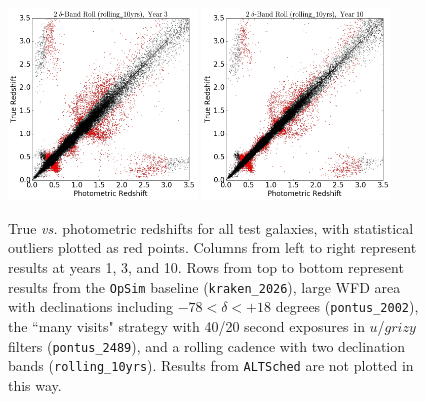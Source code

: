 \begin{figure}
\begin{center}
\includegraphics[width=5cm,trim={0cm 0cm 0cm 0cm},clip]{figures/tzpz_rolling10yrs_3.png}
\includegraphics[width=5cm,trim={0cm 0cm 0cm 0cm},clip]{figures/tzpz_rolling10yrs_10.png}
\caption{True {\it vs.} photometric redshifts for all test galaxies, with statistical outliers plotted as red points. Columns from left to right represent results at years 1, 3, and 10. Rows from top to bottom represent results from the {\tt OpSim} baseline ({\tt kraken\_2026}), large WFD area with declinations including  $-78<\delta<+18$ degrees ({\tt pontus\_2002}), the ``many visits" strategy with 40/20 second exposures in $u$/$grizy$ filters ({\tt pontus\_2489}), and a rolling cadence with two declination bands ({\tt rolling\_10yrs}). Results from {\tt ALTSched} are not plotted in this way. \label{fig:tzpz}}
\end{center}
\end{figure}

